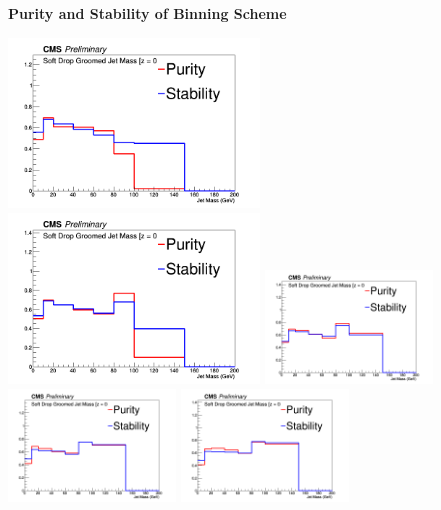 \documentclass{beamer}
\begin{document}
\begin{frame}{\textbf{Purity and Stability of Binning Scheme}}



\includegraphics[width=0.5\textwidth]{Oct31_unfoldPlots_sdB0/PurityandStability_200_260.png}%
\includegraphics[width=0.5\textwidth]{Oct31_unfoldPlots_sdB0/PurityandStability_260_350.png}
\newline
\includegraphics[width=0.3333\textwidth]{Oct31_unfoldPlots_sdB0/PurityandStability_350_460.png}%
\includegraphics[width=0.3333\textwidth]{Oct31_unfoldPlots_sdB0/PurityandStability_460_550.png}
\includegraphics[width=0.3333\textwidth]{Oct31_unfoldPlots_sdB0/PurityandStability_550_13000.png}




\end{frame}
\end{document}
